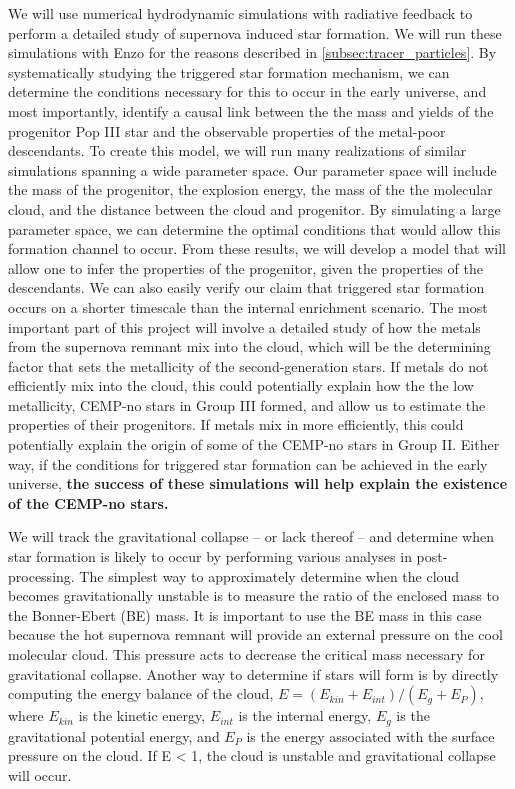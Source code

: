 \documentclass[12pt]{article}
\begin{document}
We will use numerical hydrodynamic simulations with radiative feedback to perform a detailed study of supernova induced star formation. We will run these simulations with Enzo for the reasons described in \ref{subsec:tracer_particles}. By systematically studying the triggered star formation mechanism, we can determine the conditions necessary for this to occur in the early universe, and most importantly, identify a causal link between the the mass and yields of the progenitor Pop III star and the observable properties of the metal-poor descendants. To create this model, we will run many realizations of similar simulations spanning a wide parameter space. Our parameter space will include the mass of the progenitor, the explosion energy, the mass of the the molecular cloud, and the distance between the cloud and progenitor. By simulating a large parameter space, we can determine the optimal conditions that would allow this formation channel to occur. From these results, we will develop a model that will allow one to infer the properties of the progenitor, given the properties of the descendants. We can also easily verify our claim that triggered star formation occurs on a shorter timescale than the internal enrichment scenario. The most important part of this project will involve a detailed study of how the metals from the supernova remnant mix into the cloud, which will be the determining factor that sets the metallicity of the second-generation stars. If metals do not efficiently mix into the cloud, this could potentially explain how the the low metallicity, CEMP-no stars in Group III formed, and allow us to estimate the properties of their progenitors. If metals mix in more efficiently, this could potentially explain the origin of some of the CEMP-no stars in Group II. Either way, if the conditions for triggered star formation can be achieved in the early universe, \textbf{the success of these simulations will help explain the existence of the CEMP-no stars.}

We will track the gravitational collapse -- or lack thereof -- and determine when star formation is likely to occur by performing various analyses in post-processing. The simplest way to approximately determine when the cloud becomes gravitationally unstable is to measure the ratio of the enclosed mass to the Bonner-Ebert (BE) mass. It is important to use the BE mass in this case because the hot supernova remnant will provide an external pressure on the cool molecular cloud. This pressure acts to decrease the critical mass necessary for gravitational collapse. Another way to determine if stars will form is by directly computing the energy balance of the cloud, $E = (E_{kin} + E_{int}) / (E_{g} + E_{P})$, where $E_{kin}$ is the kinetic energy, $E_{int}$ is the internal energy, $E_{g}$ is the gravitational potential energy, and $E_{P}$ is the energy associated with the surface pressure on the cloud. If E < 1, the cloud is unstable and gravitational collapse will occur.
\end{document}
